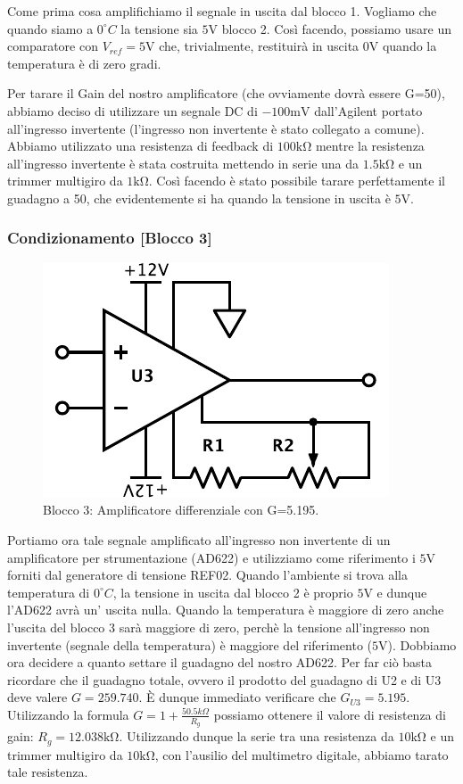 Come prima cosa amplifichiamo il segnale in uscita dal blocco 1. Vogliamo che quando siamo a $0^{\circ}C$ la tensione sia $5\si{\volt}$ blocco 2. Così facendo, possiamo usare un comparatore con $V_{ref}=5\si{\volt}$ che, trivialmente, restituirà in uscita $0\si{\volt}$ quando la temperatura è di zero gradi. 

Per tarare il Gain del nostro amplificatore (che ovviamente dovrà essere G=50), abbiamo deciso di utilizzare un segnale DC di $-100\si{\milli\volt}$ dall'Agilent portato all'ingresso invertente (l'ingresso non invertente è stato collegato a comune). Abbiamo utilizzato una resistenza di feedback di $100\si{\kilo\ohm}$ mentre la resistenza all'ingresso invertente è stata costruita mettendo in serie una da $1.5\si{\kilo\ohm}$ e un trimmer multigiro da $1\si{\kilo\ohm}$. Così facendo è stato possibile tarare perfettamente il guadagno a 50, che evidentemente si ha quando la tensione in uscita è $5\si{\volt}$. 

\subsubsection{Condizionamento [Blocco 3]}

\begin{figure}
\centering
\includegraphics[width=.25\textwidth]{../E06/latex/P3.pdf}
\caption{Blocco 3: Amplificatore differenziale con G=5.195.}
\label{cir5:2wire}
\end{figure}


Portiamo ora tale segnale amplificato all'ingresso non invertente di un amplificatore per strumentazione (AD622) e utilizziamo come riferimento i $5\si{\volt}$ forniti dal generatore di tensione REF02. Quando l'ambiente si trova alla temperatura di $0^{\circ}C$, la tensione in uscita dal blocco 2 è proprio $5\si{\volt}$ e dunque l'AD622 avrà un' uscita nulla. Quando la temperatura è maggiore di zero anche l'uscita del blocco 3 sarà maggiore di zero, perchè la tensione all'ingresso non invertente (segnale della temperatura) è maggiore del riferimento ($5\si{\volt}$). Dobbiamo ora decidere a quanto settare il guadagno del nostro AD622. Per far ciò basta ricordare che il guadagno totale, ovvero il prodotto del guadagno di U2 e di U3 deve valere $G=259.740$. È dunque immediato verificare che $G_{U3}=5.195$. Utilizzando la formula $G=1+\frac{50.5k\Omega}{R_g}$ possiamo ottenere il valore di resistenza di gain: $R_g=12.038\si{\kilo\ohm}$. Utilizzando dunque la serie tra una resistenza da $10\si{\kilo\ohm}$ e un trimmer multigiro da $10\si{\kilo\ohm}$, con l'ausilio del multimetro digitale, abbiamo tarato tale resistenza. 

